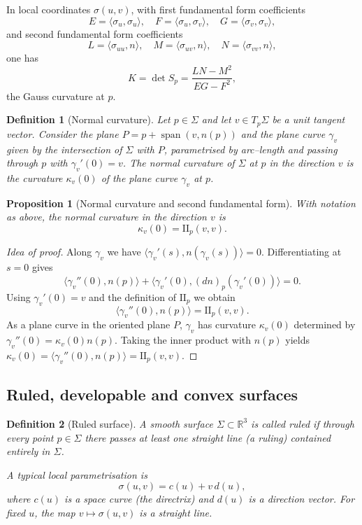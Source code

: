 \documentclass[12pt,a4paper]{article}
\newcommand{\II}{\mathrm{I\!I}}
\theoremstyle{plain}
\newtheorem{proposition}[theorem]{Proposition}
\newtheorem{definition}{Definition}
\DeclareMathOperator{\Span}{span}
\theoremstyle{definition}      %
\begin{document}
In local coordinates $\sigma(u,v)$, with first fundamental form
coefficients
\[
E=\langle\sigma_u,\sigma_u\rangle,\quad
F=\langle\sigma_u,\sigma_v\rangle,\quad
G=\langle\sigma_v,\sigma_v\rangle,
\]
and second fundamental form coefficients
\[
L=\langle\sigma_{uu},n\rangle,\quad
M=\langle\sigma_{uv},n\rangle,\quad
N=\langle\sigma_{vv},n\rangle,
\]
one has
\[
K = \det S_p
= \frac{LN-M^2}{EG-F^2},
\]
the Gauss curvature at $p$.

\begin{definition}[Normal curvature]
	Let $p\in\Sigma$ and let $v\in T_p\Sigma$ be a unit tangent vector.
	Consider the plane $P = p + \Span(v,n(p))$ and the plane curve
	$\gamma_v$ given by the intersection of $\Sigma$ with $P$, parametrised
	by arc--length and passing through $p$ with $\gamma_v'(0)=v$.
	The \emph{normal curvature} of $\Sigma$ at $p$ in the direction $v$ is
	the curvature $\kappa_v(0)$ of the plane curve $\gamma_v$ at $p$.
\end{definition}

\begin{proposition}[Normal curvature and second fundamental form]
	With notation as above, the normal curvature in the direction $v$ is
	\[
	\kappa_v(0)=\II_p(v,v).
	\]
\end{proposition}

\begin{proof}[Idea of proof]
	Along $\gamma_v$ we have $\langle\gamma_v'(s),n(\gamma_v(s))\rangle=0$.
	Differentiating at $s=0$ gives
	\[
	\langle\gamma_v''(0),n(p)\rangle
	+ \langle\gamma_v'(0),(dn)_p(\gamma_v'(0))\rangle = 0.
	\]
	Using $\gamma_v'(0)=v$ and the definition of $\II_p$ we obtain
	\[
	\langle\gamma_v''(0),n(p)\rangle = \II_p(v,v).
	\]
	As a plane curve in the oriented plane $P$, $\gamma_v$ has curvature
	$\kappa_v(0)$ determined by $\gamma_v''(0)=\kappa_v(0)n(p)$.  Taking the
	inner product with $n(p)$ yields $\kappa_v(0)=\langle\gamma_v''(0),n(p)\rangle
	= \II_p(v,v)$.
\end{proof}

\subsection{Ruled, developable and convex surfaces}

\begin{definition}[Ruled surface]
	A smooth surface $\Sigma\subset\mathbb{R}^3$ is called \emph{ruled} if
	through every point $p\in\Sigma$ there passes at least one straight
	line (a \emph{ruling}) contained entirely in $\Sigma$.
	
	A typical local parametrisation is
	\[
	\sigma(u,v)=c(u)+v\,d(u),
	\]
	where $c(u)$ is a space curve (the \emph{directrix}) and $d(u)$ is a
	direction vector.  For fixed $u$, the map $v\mapsto\sigma(u,v)$ is a
	straight line.
\end{definition}
\end{document}
